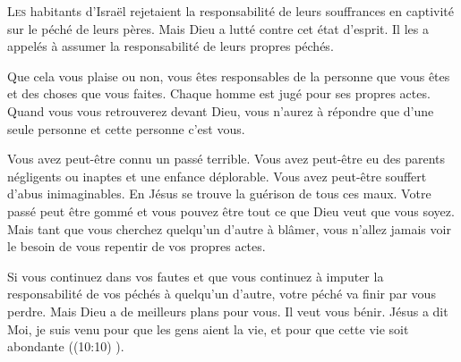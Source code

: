 \dvrule







\lettrine{L}{es} habitants d'Israël rejetaient la responsabilité
 de leurs souffrances en captivité sur le péché de leurs pères.
 Mais Dieu a lutté contre cet état d'esprit.
 Il les a appelés à assumer la responsabilité de leurs propres péchés. 

Que cela vous plaise ou non, vous êtes responsables de la personne
 que vous êtes et des choses que vous faites.
 Chaque homme est jugé pour ses propres actes.
 Quand vous vous retrouverez devant Dieu, 
 vous n'aurez à répondre que d'une seule personne
 \ocadr et cette personne c'est vous. 


Vous avez peut-être connu un passé terrible.
 Vous avez peut-être eu des parents négligents ou inaptes
 et une enfance déplorable. Vous avez peut-être souffert
 d'abus inimaginables. En Jésus se trouve la guérison de tous ces maux.
 Votre passé peut être gommé et vous pouvez être tout ce que Dieu
 veut que vous soyez. Mais tant que vous cherchez 
 quelqu'un d'autre à blâmer, vous n'allez jamais voir le besoin
 de vous repentir de vos propres actes. 

Si vous continuez dans vos fautes et que vous continuez
 à imputer la responsabilité de vos péchés à quelqu'un d'autre,
 votre péché va finir par vous perdre.
 Mais Dieu a de meilleurs plans pour vous. Il veut vous bénir.
 Jésus a dit\frcolon{} 
 \Og Moi, je suis venu pour que les gens aient la vie,
 et pour que cette vie soit abondante \Fg{} ((10:10) \BFC). 

